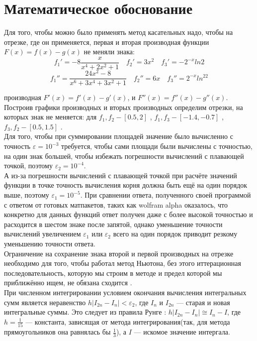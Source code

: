\documentclass[a4paper,12pt,titlepage,finall]{article}
\begin{document}
\newpage

\section{Математическое обоснование}

Для того, чтобы можно было применять метод касательных надо, чтобы на отрезке, где он применяется, первая и вторая производная функции $F(x) = f(x) - g(x)$ не меняли знака:
\[
f_1' = -8 \frac{x}{x^4 + 2x^2 + 1} \quad f_2' = 3x^2 \quad f_3'= -2^{-x}ln2
\]
\[
f_1'' = \frac{24x^2 - 8}{x^6 + 3x^4 + 3x^2 + 1} \quad f_2'' = 6x \quad f_3'' = 2^{-x}ln^22
\]

производная $F'(x) = f'(x) - g'(x)$, и $F''(x) = f''(x) - g''(x)$. Построив графики производных и вторых производных определим отрезки, на которых знак не меняется: для $f_1, f_2 - [0.5, 2]$ , $f_1, f_3 - [-1.4, -0.7]$ , $f_3, f_2 - [0.5, 1.5]$ .\\ Для того, чтобы при суммировании площадей значение было вычисленно с точность $\varepsilon = 10^{-3}$ требуется, чтобы сами площади были вычислены с точностью, на один знак большей, чтобы избежать погрешности вычислений с плавающей точкой, поэтому $\varepsilon_2 = 10^{-4}$.\\ А из-за погрешности вычислений с плавающей точкой при расчёте значений функции в точке точность вычисления корня должна быть ещё на один порядок выше, поэтому $\varepsilon_1 = 10^{-5}$. При сравнении ответа, полученного своей программой с ответом от готовых матпакетов, таких как wolfram alpha оказалось, что конкретно для данных функций ответ получен даже с более высокой точностью и расходится в шестом знаке после запятой, однако уменьшение точности вычислений увеличением $\varepsilon_1$ или $\varepsilon_2$ всего на один порядок приводит резкому уменьшению точности ответа. \\

Ограничение на сохранение знака второй и первой производных на отрезке необходимо для того, чтобы работал метод Ньютона, без этого иттерационная последовательность, которую мы строим в методе и предел которой мы приближённо ищем, не обязана сходится \cite{math}.\\

При численном интегрировании условием окончания вычисления интегральных сумм является неравенство $h|I_{2n} - I_n| < \varepsilon_2$, где $I_n$ и  $I_{2n}$ --- старая и новая интегральные суммы. Это следует из правила Рунге \cite{Rhunge} : $h|I_{2n} - I_n| \cong I_n - I$, где $h = \frac{1}{15}$ --- константа, зависящая от метода интегрирования(так, для метода прямоугольников она равнялась бы $\frac{1}{3}$), а $I$ --- искомое значение интергала.
 
\end{document}
